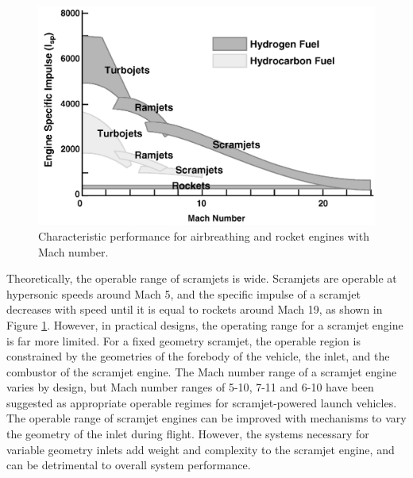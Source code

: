     
    
    
    \begin{figure}[ht]
    	\centering
    	\includegraphics[width=0.7\linewidth]{figures/2_literature-review/Scramjet-Efficiency}
    	\caption{Characteristic performance for airbreathing and rocket engines with Mach number\cite{Fry2004}.}
    	\label{fig:Scramjet-Efficiency}
    \end{figure}
    
    Theoretically, the operable range of scramjets is wide\cite{Smart2007a}. Scramjets are operable at hypersonic speeds around Mach 5, and the specific impulse of a scramjet decreases with speed until it is equal to rockets around Mach 19\cite{Fry2004}, as shown in Figure \ref{fig:Scramjet-Efficiency}. 
    However, in practical designs, the operating range for a scramjet engine is far more limited. 
    For a fixed geometry scramjet, the operable region is constrained by the geometries of the forebody of the vehicle, the inlet, and the combustor of the scramjet engine\cite{Smart2010}.  
    The Mach number range of a scramjet engine varies by design, but Mach number ranges of 5-10\cite{Preller2017b}, 7-11\cite{Dalle2014} and 6-10\cite{Bradford2000} have been suggested as appropriate operable regimes for scramjet-powered launch vehicles.
    The operable range of scramjet engines can be improved with mechanisms to vary the geometry of the inlet during flight\cite{Dalle2011}. However, the systems necessary for variable geometry inlets add weight and complexity to the scramjet engine, and can be detrimental to overall system performance\cite{Smart2010}. 
    
